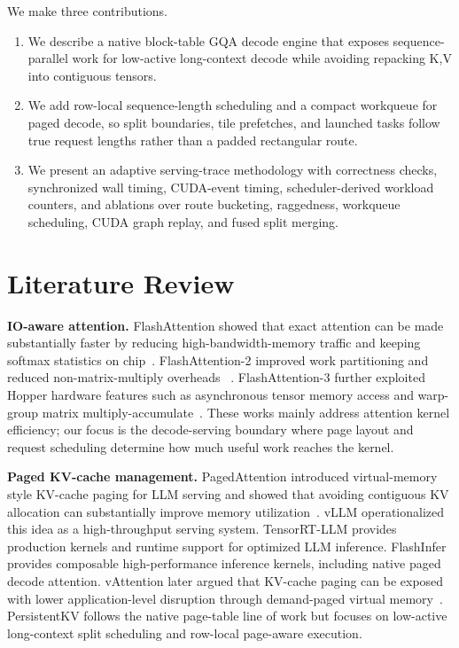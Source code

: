 \documentclass[10pt]{article}
\begin{document}
We make three contributions.
\begin{enumerate}
  \item We describe a native block-table GQA decode engine that exposes
  sequence-parallel work for low-active long-context decode while avoiding
  repacking K,V into contiguous tensors.
  \item We add row-local sequence-length scheduling and a compact workqueue for
  paged decode, so split boundaries, tile prefetches, and launched tasks follow
  true request lengths rather than a padded rectangular route.
  \item We present an adaptive serving-trace methodology with correctness
  checks, synchronized wall timing, CUDA-event timing, scheduler-derived
  workload counters, and ablations over route bucketing, raggedness, workqueue
  scheduling, CUDA graph replay, and fused split merging.
\end{enumerate}

\section{Literature Review}

\textbf{IO-aware attention.} FlashAttention showed that exact attention can be
made substantially faster by reducing high-bandwidth-memory traffic and keeping
softmax statistics on chip~\cite{dao2022flashattention}. FlashAttention-2
improved work partitioning and reduced non-matrix-multiply overheads
~\cite{dao2023flashattention2}. FlashAttention-3 further exploited Hopper
hardware features such as asynchronous tensor memory access and warp-group
matrix multiply-accumulate~\cite{shah2024flashattention3}. These works mainly
address attention kernel efficiency; our focus is the decode-serving boundary
where page layout and request scheduling determine how much useful work reaches
the kernel.

\textbf{Paged KV-cache management.} PagedAttention introduced virtual-memory
style KV-cache paging for LLM serving and showed that avoiding contiguous KV
allocation can substantially improve memory utilization~\cite{kwon2023efficient}.
vLLM operationalized this idea as a high-throughput serving system. TensorRT-LLM
provides production kernels and runtime support for optimized LLM inference.
FlashInfer provides composable high-performance inference kernels, including
native paged decode attention. vAttention later argued that KV-cache paging can
be exposed with lower application-level disruption through demand-paged virtual
memory~\cite{prabhu2024vattention}. PersistentKV follows the native page-table
line of work but focuses on low-active long-context split scheduling and
row-local page-aware execution.
\end{document}

